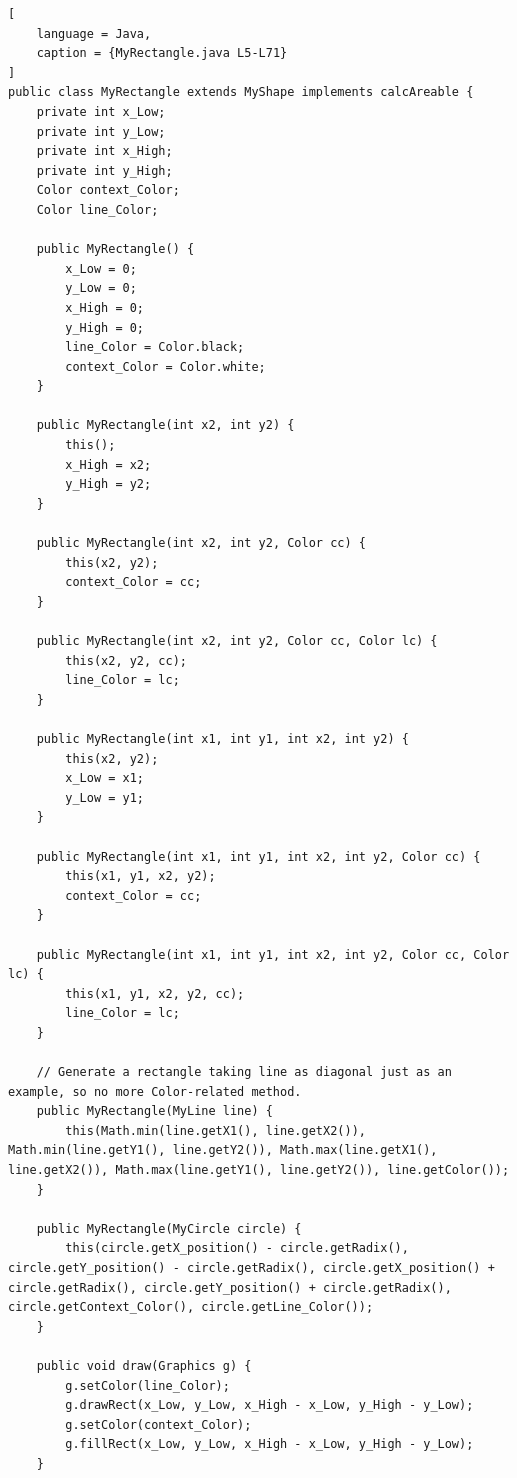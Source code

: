 \begin{lstlisting}[
	language = Java,
	caption = {MyRectangle.java L5-L71}
]
public class MyRectangle extends MyShape implements calcAreable {
	private int x_Low;
	private int y_Low;
	private int x_High;
	private int y_High;
	Color context_Color;
	Color line_Color;

	public MyRectangle() {
		x_Low = 0;
		y_Low = 0;
		x_High = 0;
		y_High = 0;
		line_Color = Color.black;
		context_Color = Color.white;
	}

	public MyRectangle(int x2, int y2) {
		this();
		x_High = x2;
		y_High = y2;
	}

	public MyRectangle(int x2, int y2, Color cc) {
		this(x2, y2);
		context_Color = cc;
	}

	public MyRectangle(int x2, int y2, Color cc, Color lc) {
		this(x2, y2, cc);
		line_Color = lc;
	}

	public MyRectangle(int x1, int y1, int x2, int y2) {
		this(x2, y2);
		x_Low = x1;
		y_Low = y1;
	}

	public MyRectangle(int x1, int y1, int x2, int y2, Color cc) {
		this(x1, y1, x2, y2);
		context_Color = cc;
	}

	public MyRectangle(int x1, int y1, int x2, int y2, Color cc, Color lc) {
		this(x1, y1, x2, y2, cc);
		line_Color = lc;
	}

	// Generate a rectangle taking line as diagonal just as an example, so no more Color-related method.
	public MyRectangle(MyLine line) {
		this(Math.min(line.getX1(), line.getX2()), Math.min(line.getY1(), line.getY2()), Math.max(line.getX1(), line.getX2()), Math.max(line.getY1(), line.getY2()), line.getColor());
	}

	public MyRectangle(MyCircle circle) {
		this(circle.getX_position() - circle.getRadix(), circle.getY_position() - circle.getRadix(), circle.getX_position() + circle.getRadix(), circle.getY_position() + circle.getRadix(), circle.getContext_Color(), circle.getLine_Color());
	}

	public void draw(Graphics g) {
		g.setColor(line_Color);
		g.drawRect(x_Low, y_Low, x_High - x_Low, y_High - y_Low);
		g.setColor(context_Color);
		g.fillRect(x_Low, y_Low, x_High - x_Low, y_High - y_Low);
	}
\end{lstlisting}





